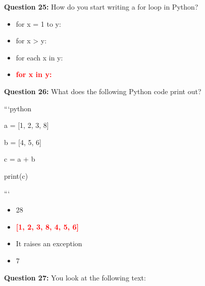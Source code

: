 \documentclass[12pt,a4paper]{article}
\begin{document}
\vspace{0.5cm}

\textbf{Question 25:} How do you start writing a for loop in Python?

\begin{itemize}
    \item[\textbf{A.}] for x = 1 to y:
    \item[\textbf{B.}] for x > y:
    \item[\textbf{C.}] for each x in y:
    \item[\textbf{D.}] \textcolor{red}{\textbf{for x in y:}}
\end{itemize}

\vspace{0.5cm}

\textbf{Question 26:} What does the following Python code print out?\newline

\newline
\newline

\newline
```python\newline

\newline
a = [1, 2, 3, 8]\newline

\newline
b = [4, 5, 6]\newline

\newline
c = a + b\newline

\newline
print(c)\newline

\newline
```

\begin{itemize}
    \item[\textbf{A.}] 28
    \item[\textbf{B.}] \textcolor{red}{\textbf{[1, 2, 3, 8, 4, 5, 6]}}
    \item[\textbf{C.}] It raises an exception
    \item[\textbf{D.}] 7
\end{itemize}

\vspace{0.5cm}

\textbf{Question 27:} You look at the following text:\newline
\end{document}
